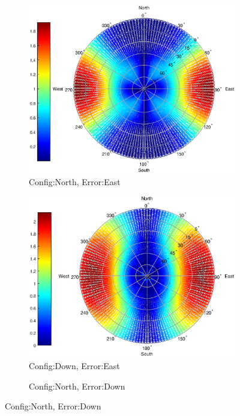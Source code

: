 \begin{figure}
\begin{subfigure}{0.49\textwidth}
\centering
\caption{Config:North, Error:East}
\includegraphics[width =\linewidth]{ChapterExperiments/Figures/plane_Eeast_north_pow4}
\end{subfigure}
\begin{subfigure}{0.49\linewidth}
\centering
\caption{Config:Down, Error:East}
\includegraphics[width = \linewidth]{ChapterExperiments/Figures/plane_Eeast_down_pow4}
\end{subfigure}
\begin{subfigure}{0.49\textwidth}
\centering
\caption{Config:North, Error:Down}

\end{subfigure}
\end{figure}
